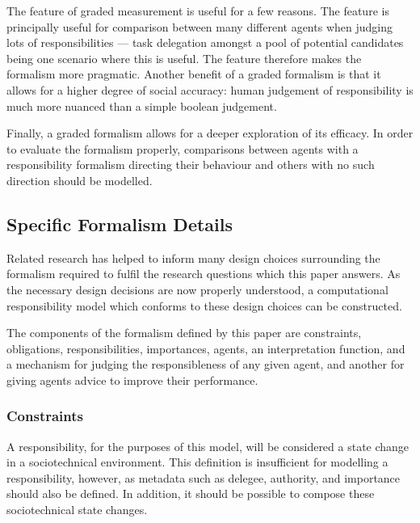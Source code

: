 The feature of graded measurement is useful for a few reasons. The feature is principally useful for comparison between many different agents when judging lots of responsibilities --- task delegation amongst a pool of potential candidates being one scenario where this is useful. The feature therefore makes the formalism more pragmatic. Another benefit of a graded formalism is that it allows for a higher degree of social accuracy: human judgement of responsibility is much more nuanced than a simple boolean judgement.\par

Finally, a graded formalism allows for a deeper exploration of its efficacy. In order to evaluate the formalism properly, comparisons between agents with a responsibility formalism directing their behaviour and others with no such direction should be modelled.\par

\subsection{Specific Formalism Details}

Related research has helped to inform many design choices surrounding the formalism required to fulfil the research questions which this paper answers. As the necessary design decisions are now properly understood, a computational responsibility model which conforms to these design choices can be constructed.\par

The components of the formalism defined by this paper are constraints, obligations, responsibilities, importances, agents, an interpretation function, and a mechanism for judging the responsibleness of any given agent, and another for giving agents advice to improve their performance.\par

\subsubsection{Constraints}  %
A responsibility, for the purposes of this model, will be considered a state change in a sociotechnical environment. This definition is insufficient for modelling a responsibility, however, as metadata such as delegee, authority, and importance should also be defined. In addition, it should be possible to compose these sociotechnical state changes.\par

